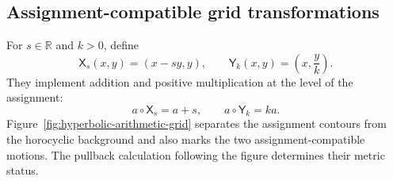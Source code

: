 \subsection{Assignment-compatible grid transformations}

For \(s\in\mathbb R\) and \(k>0\), define
\begin{equation}\label{eq:assignment-grid-transformations}
 \mathsf X_s(x,y)=(x-sy,y),
 \qquad
 \mathsf Y_k(x,y)=\left(x,\frac yk\right).
\end{equation}
They implement addition and positive multiplication at the level of the
assignment:
\begin{equation}\label{eq:grid-assignment-action}
 a\circ\mathsf X_s=a+s,
 \qquad
 a\circ\mathsf Y_k=ka.
\end{equation}
Figure~\ref{fig:hyperbolic-arithmetic-grid} separates the assignment contours
from the horocyclic background and also marks the two assignment-compatible
motions.  The pullback calculation following the figure determines their
metric status.

